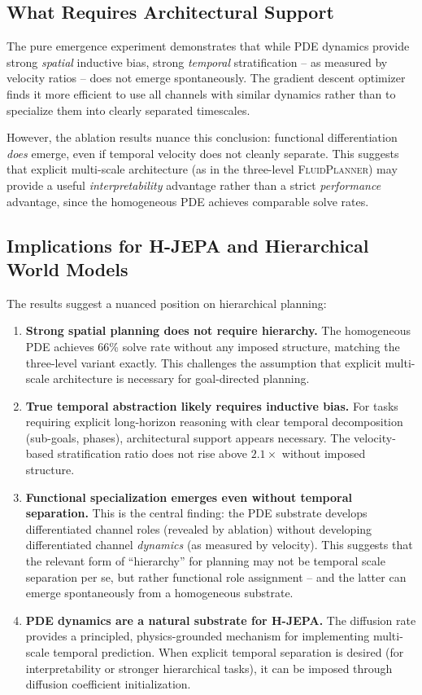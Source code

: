 \documentclass{article}
\newcommand{\fluidplanner}{\textsc{FluidPlanner}}
\begin{document}
\subsection{What Requires Architectural Support}

The pure emergence experiment demonstrates that while PDE dynamics provide strong \emph{spatial} inductive bias, strong \emph{temporal} stratification -- as measured by velocity ratios -- does not emerge spontaneously. The gradient descent optimizer finds it more efficient to use all channels with similar dynamics rather than to specialize them into clearly separated timescales.

However, the ablation results nuance this conclusion: functional differentiation \emph{does} emerge, even if temporal velocity does not cleanly separate. This suggests that explicit multi-scale architecture (as in the three-level \fluidplanner{}) may provide a useful \emph{interpretability} advantage rather than a strict \emph{performance} advantage, since the homogeneous PDE achieves comparable solve rates.

\subsection{Implications for H-JEPA and Hierarchical World Models}

The results suggest a nuanced position on hierarchical planning:

\begin{enumerate}
    \item \textbf{Strong spatial planning does not require hierarchy.} The homogeneous PDE achieves 66\% solve rate without any imposed structure, matching the three-level variant exactly. This challenges the assumption that explicit multi-scale architecture is necessary for goal-directed planning.
    \item \textbf{True temporal abstraction likely requires inductive bias.} For tasks requiring explicit long-horizon reasoning with clear temporal decomposition (sub-goals, phases), architectural support appears necessary. The velocity-based stratification ratio does not rise above $2.1\times$ without imposed structure.
    \item \textbf{Functional specialization emerges even without temporal separation.} This is the central finding: the PDE substrate develops differentiated channel roles (revealed by ablation) without developing differentiated channel \emph{dynamics} (as measured by velocity). This suggests that the relevant form of ``hierarchy'' for planning may not be temporal scale separation per se, but rather functional role assignment -- and the latter can emerge spontaneously from a homogeneous substrate.
    \item \textbf{PDE dynamics are a natural substrate for H-JEPA.} The diffusion rate provides a principled, physics-grounded mechanism for implementing multi-scale temporal prediction. When explicit temporal separation is desired (for interpretability or stronger hierarchical tasks), it can be imposed through diffusion coefficient initialization.
\end{enumerate}
\end{document}
